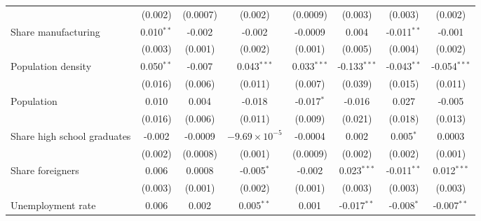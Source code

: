 \begin{table}[htbp]
\begin{tabular}{lccccccc}
                                                              & (0.002)        & (0.0007)       & (0.002)                & (0.0009)       & (0.003)        & (0.003)        & (0.002)\\   
      Share manufacturing                                     & 0.010$^{**}$   & -0.002         & -0.002                 & -0.0009        & 0.004          & -0.011$^{**}$  & -0.001\\   
                                                              & (0.003)        & (0.001)        & (0.002)                & (0.001)        & (0.005)        & (0.004)        & (0.002)\\   
      Population density                                      & 0.050$^{**}$   & -0.007         & 0.043$^{***}$          & 0.033$^{***}$  & -0.133$^{***}$ & -0.043$^{**}$  & -0.054$^{***}$\\   
                                                              & (0.016)        & (0.006)        & (0.011)                & (0.007)        & (0.039)        & (0.015)        & (0.011)\\   
      Population                                              & 0.010          & 0.004          & -0.018                 & -0.017$^{*}$   & -0.016         & 0.027          & -0.005\\   
                                                              & (0.016)        & (0.006)        & (0.011)                & (0.009)        & (0.021)        & (0.018)        & (0.013)\\   
      Share high school graduates                             & -0.002         & -0.0009        & $-9.69\times 10^{-5}$  & -0.0004        & 0.002          & 0.005$^{*}$    & 0.0003\\   
                                                              & (0.002)        & (0.0008)       & (0.001)                & (0.0009)       & (0.002)        & (0.002)        & (0.001)\\   
      Share foreigners                                        & 0.006          & 0.0008         & -0.005$^{*}$           & -0.002         & 0.023$^{***}$  & -0.011$^{**}$  & 0.012$^{***}$\\   
                                                              & (0.003)        & (0.001)        & (0.002)                & (0.001)        & (0.003)        & (0.003)        & (0.003)\\   
      Unemployment rate                                       & 0.006          & 0.002          & 0.005$^{**}$           & 0.001          & -0.017$^{**}$  & -0.008$^{*}$   & -0.007$^{**}$\\   

\end{tabular}
\end{table}
